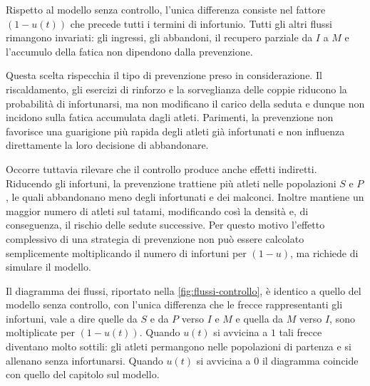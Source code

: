 Rispetto al modello senza controllo, l'unica differenza consiste nel fattore $(1 - u(t))$ che precede tutti i termini di infortunio. Tutti gli altri flussi rimangono invariati: gli ingressi, gli abbandoni, il recupero parziale da $I$ a $M$ e l'accumulo della fatica non dipendono dalla prevenzione. \par

Questa scelta rispecchia il tipo di prevenzione preso in considerazione. Il riscaldamento, gli esercizi di rinforzo e la sorveglianza delle coppie riducono la probabilità di infortunarsi, ma non modificano il carico della seduta e dunque non incidono sulla fatica accumulata dagli atleti. Parimenti, la prevenzione non favorisce una guarigione più rapida degli atleti già infortunati e non influenza direttamente la loro decisione di abbandonare. \par

Occorre tuttavia rilevare che il controllo produce anche effetti indiretti. Riducendo gli infortuni, la prevenzione trattiene più atleti nelle popolazioni $S$ e $P$, le quali abbandonano meno degli infortunati e dei malconci. Inoltre mantiene un maggior numero di atleti sul tatami, modificando così la densità e, di conseguenza, il rischio delle sedute successive. Per questo motivo l'effetto complessivo di una strategia di prevenzione non può essere calcolato semplicemente moltiplicando il numero di infortuni per $(1 - u)$, ma richiede di simulare il modello. \par

Il diagramma dei flussi, riportato nella \autoref{fig:flussi-controllo}, è identico a quello del modello senza controllo, con l'unica differenza che le frecce rappresentanti gli infortuni, vale a dire quelle da $S$ e da $P$ verso $I$ e $M$ e quella da $M$ verso $I$, sono moltiplicate per $(1 - u(t))$. Quando $u(t)$ si avvicina a $1$ tali frecce diventano molto sottili: gli atleti permangono nelle popolazioni di partenza e si allenano senza infortunarsi. Quando $u(t)$ si avvicina a $0$ il diagramma coincide con quello del capitolo sul modello.

